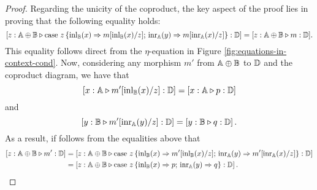 \documentclass[a4paper,UKenglish,cleveref, autoref, thm-restate]{lipics-v2021}
\begin{document}
\begin{proof}
  Regarding the unicity of the coproduct, the key aspect of the proof lies in proving that the following equality holds: 
  $$\left[z:\mathbb{A} \oplus \mathbb{B}  \triangleright \text{case } z \,\{\mathrm{inl}_{\mathbb{B}}(x) \Rightarrow m[\mathrm{inl}_{\mathbb{B}}(x)/ z] ; \, \mathrm{inr}_{\mathbb{A}}(y) \Rightarrow m[\mathrm{inr}_{\mathbb{A}}(x)/ z]\}: \mathbb{D}\right] = [z:\mathbb{A} \oplus \mathbb{B} \triangleright m: \mathbb{D}].$$ 
  This equality follows direct from the $\eta$-equation in Figure \ref{fig:equations-in-context-cond}. Now, considering any morphism $m'$ from $\mathbb{A} \oplus \mathbb{B}$ to $\mathbb{D}$ and the coproduct diagram, we have that 
  $$\left[ x: \mathbb{A} \triangleright m'[ \mathrm{inl}_{\mathbb{B}}(x)/z]: \mathbb{D}\right]  = \left[x: \mathbb{A}  \triangleright p: \mathbb{D}\right]  $$ 
  and
  $$\left[ y: \mathbb{B}  \triangleright m'[\mathrm{inr}_{\mathbb{A}}(y)/z]: \mathbb{D}\right] = \left[y: \mathbb{B}  \triangleright q: \mathbb{D}\right].$$
  As a result, if follows from the equalities above that 
  \begin{align*}
    \left[z:\mathbb{A} \oplus \mathbb{B}  \triangleright m': \mathbb{D}\right]& =\left[z:\mathbb{A} \oplus \mathbb{B}  \triangleright \text{case } z \,\{\mathrm{inl}_{\mathbb{B}}(x) \Rightarrow m'[\mathrm{inl}_{\mathbb{B}}(x)/ z] ; \, \mathrm{inr}_{\mathbb{A}}(y) \Rightarrow m'[\mathrm{inr}_{\mathbb{A}}(x)/ z]\}: \mathbb{D}\right]\\
    & = \left[z:\mathbb{A} \oplus \mathbb{B}  \triangleright \text{case } z \,\{\mathrm{inl}_{\mathbb{B}}(x) \Rightarrow p ; \, \mathrm{inr}_{\mathbb{A}}(y) \Rightarrow q\}: \mathbb{D}\right]. 
  \end{align*}
 

\end{proof}
\end{document}
